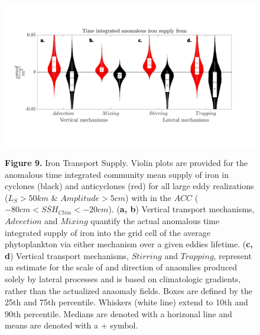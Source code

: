\documentclass{article}
\begin{document}
\begin{figure}[!htbp]
 \centering
  \begin{adjustwidth}{-1.8in}{-1in}
        \includegraphics[scale=.74]{Fig9.pdf} \\
  \end{adjustwidth}
\caption[Iron Transport Supply ]
{\textbf{Figure 9.} Iron Transport Supply. Violin plots are provided for the anomalous time integrated community mean supply of iron in cyclones (black) and anticyclones (red) for all large eddy realizations ($L_S>50km$ \& $Amplitude>5cm$) with in the $ACC$ ($-80cm<\overline{SSH}_{Clim}<-20cm$). (\textbf{a, b}) Vertical transport mechanisms, $Advection$ and $Mixing$ quantify the actual anomalous time integrated supply of iron into the grid cell of the average phytoplankton via either mechanism over a given eddies lifetime. (\textbf{c, d}) Vertical transport mechanisms, $Stirring$ and $Trapping$, represent an estimate for the scale of and direction of anaomlies produced solely by lateral processes and is based on climatologic gradients, rather than the actualized anaomaly fields. Boxes are defined by the 25th and 75th percentile. Whiskers (white line) extend to 10th and 90th percentile. Medians are denoted with a horizonal line and means are denoted with a + symbol.
}
\label{fig:Fig9}
\end{figure}

\end{document}
